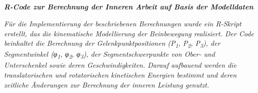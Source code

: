 \documentclass[
  letterpaper,
  DIV=11]{scrartcl}
\makeatletter
\let\oldsubparagraph\subparagraph
\renewcommand{\subparagraph}{
    \@ifstar
      \xxxSubParagraphStar
      \xxxSubParagraphNoStar
  }
\newcommand{\xxxSubParagraphStar}[1]{\oldsubparagraph*{#1}\mbox{}}
\newcommand{\xxxSubParagraphNoStar}[1]{\oldsubparagraph{#1}\mbox{}}
\makeatother
\begin{document}
\subparagraph{\texorpdfstring{\textbf{\emph{R-Code zur Berechnung der
Inneren Arbeit auf Basis der
Modelldaten}}}{R-Code zur Berechnung der Inneren Arbeit auf Basis der Modelldaten}}\label{r-code-zur-berechnung-der-inneren-arbeit-auf-basis-der-modelldaten}

\emph{Für die Implementierung der beschriebenen Berechnungen wurde ein
R-Skript erstellt, das die kinematische Modellierung der Beinbewegung
realisiert. Der Code beinhaltet die Berechnung der Gelenkpunktpositionen
(P\textsubscript{1}, P\textsubscript{2}, P\textsubscript{3}), der
Segmentwinkel (φ\textsubscript{1}, φ\textsubscript{2},
φ\textsubscript{3}), der Segmentschwerpunkte von Ober- und Unterschenkel
sowie deren Geschwindigkeiten. Darauf aufbauend werden die
translatorischen und rotatorischen kinetischen Energien bestimmt und
deren zeitliche Änderungen zur Berechnung der inneren Leistung genutzt.}
\end{document}
